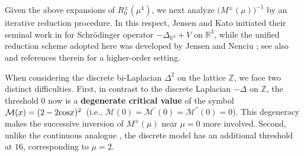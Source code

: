 \documentclass[reqno, 11pt]{amsart}
\newcommand\R{\mathbb{R}}
\newcommand\Z{\mathbb{Z}}
\newcommand\mcaM{\mathcal{M}}
\numberwithin{equation}{section}
\begin{document}
Given the above expansions of $R_0^\pm(\mu^4)$, we next analyze $\bigl(M^\pm(\mu)\bigr)^{-1}$ by an iterative reduction procedure. In this respect, Jensen and Kato initiated their seminal work in \cite{JK79} for Schr\"odinger operator $-\Delta_{\R^3}+V$ on $\R^3$, while the unified reduction scheme adopted here was developed by Jensen and Nenciu \cite{JN01}; see also \cite{SWY22} and references therein for a higher-order setting.

When considering the discrete bi-Laplacian $\Delta^2$ on the lattice $\Z$, we face two distinct difficulties.
First, in contrast to the discrete Laplacian $-\Delta$ on $\Z$, the threshold $0$ now is a {\bf degenerate critical value} of the symbol $\mcaM(x)=(2-2{\rm cos}x)^2$~(i.e., $\mcaM(0)=\mcaM^{'}(0)=\mcaM^{''}(0)=0$). This degeneracy makes the successive inversion of $M^\pm(\mu)$ near $\mu=0$ more involved. Second, unlike the continuous analogue \cite{SWY22}, the discrete model has an additional threshold at $16$, corresponding to $\mu=2$.
\end{document}

